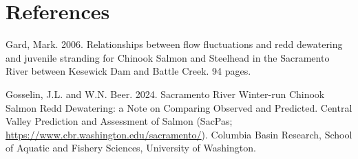 \documentclass[
]{article}
\begin{document}
\hypertarget{references}{%
\section{References}\label{references}}

Gard, Mark. 2006. Relationships between flow fluctuations and redd
dewatering and juvenile stranding for Chinook Salmon and Steelhead in
the Sacramento River between Kesewick Dam and Battle Creek. 94 pages.

Gosselin, J.L. and W.N. Beer. 2024. Sacramento River Winter-run Chinook
Salmon Redd Dewatering: a Note on Comparing Observed and Predicted.
Central Valley Prediction and Assessment of Salmon (SacPas;
\url{https://www.cbr.washington.edu/sacramento/}). Columbia Basin
Research, School of Aquatic and Fishery Sciences, University of
Washington.
\end{document}
